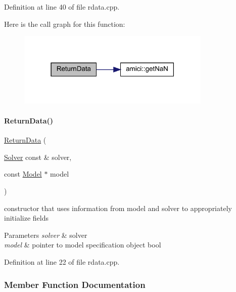 Definition at line 40 of file rdata.\+cpp.

Here is the call graph for this function\+:
\nopagebreak
\begin{figure}[H]
\begin{center}
\leavevmode
\includegraphics[width=262pt]{classamici_1_1_return_data_a8a1111d7dbceb11f6c6d8aa7bbacfd7d_cgraph}
\end{center}
\end{figure}
\mbox{\label{classamici_1_1_return_data_a9fa947e466f4c7f55d36d1e81722abdc}} 
\paragraph{\texorpdfstring{Return\+Data()}{ReturnData()}\hspace{0.1cm}{\footnotesize\ttfamily [2/2]}}
{\footnotesize\ttfamily \mbox{\hyperlink{classamici_1_1_return_data}{Return\+Data}} (\begin{DoxyParamCaption}\item[{\mbox{\hyperlink{classamici_1_1_solver}{Solver}} const \&}]{solver,  }\item[{const \mbox{\hyperlink{classamici_1_1_model}{Model}} $\ast$}]{model }\end{DoxyParamCaption})}

constructor that uses information from model and solver to appropriately initialize fields 
\begin{DoxyParams}{Parameters}
{\em solver} & solver \\
\hline
{\em model} & pointer to model specification object bool\\
\hline
\end{DoxyParams}


Definition at line 22 of file rdata.\+cpp.



\subsubsection{Member Function Documentation}
\mbox{\label{classamici_1_1_return_data_ab320e46748c17908f0bd4bba240b8e92}} 
